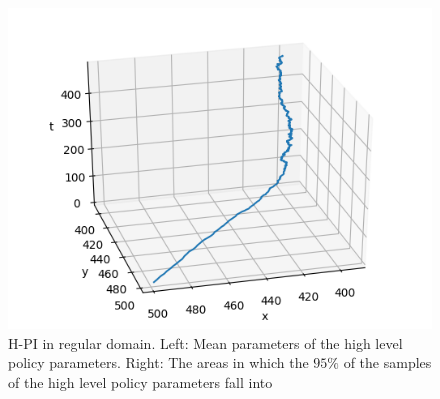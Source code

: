 \begin{figure}[t]
	\centering
    \begin{minipage}{0.55\textwidth}
    	\includegraphics[width=\textwidth]{plots/big/H-PI-mu.png}
    \end{minipage}
    \begin{minipage}{0.44\textwidth}
    	\setlength\figureheight{5cm}  
		\setlength\figurewidth{5cm}
		
    \end{minipage}
    \caption[H-PI mean value and variance in regular environment]{H-PI in regular domain. Left: Mean parameters of the high level policy parameters. Right: The areas in which the $95\%$ of the samples of the high level policy parameters fall into}
    \label{fig:big_h_pi_mu_sigma}
\end{figure}


